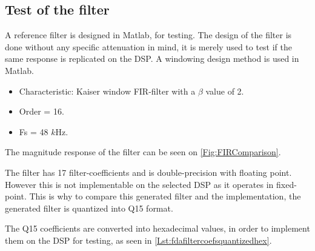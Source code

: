 \subsection{Test of the filter}
A reference filter is designed in Matlab, for testing. The design of the filter is done without any specific attenuation in mind, it is merely used to test if the same response is replicated on the DSP. A windowing design method is used in Matlab.


\begin{itemize}
	\item Characteristic: Kaiser window FIR-filter with a $\beta$ value of 2.
	\item Order = 16.
	\item Fs = 48 $k$Hz.
\end{itemize}


The magnitude response of the filter can be seen on \autoref{Fig:FIRComparison}. 



The filter has 17 filter-coefficients and is double-precision with floating point. However this is not implementable on the selected DSP as it operates in fixed-point. This is why to compare this generated filter and the implementation, the generated filter is quantized into Q15 format.


The Q15 coefficients are converted into hexadecimal values, in order to implement them on the DSP for testing, as seen in \autoref{Lst:fdafiltercoefsquantizedhex}. 

